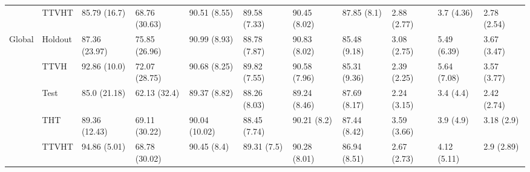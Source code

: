 \begin{table}
\begin{tabular}{lllllllllll}
       & TTVHT &   85.79 (16.7) &  68.76 (30.63) &   90.51 (8.55) &  89.58 (7.33) &  90.45 (8.02) &   87.85 (8.1) &      2.88 (2.77) &   3.7 (4.36) &  2.78 (2.54) \\
Global & Holdout &  87.36 (23.97) &  75.85 (26.96) &   90.99 (8.93) &  88.78 (7.87) &  90.83 (8.02) &  85.48 (9.18) &      3.08 (2.75) &  5.49 (6.39) &  3.67 (3.47) \\
       & TTVH &   92.86 (10.0) &  72.07 (28.75) &   90.68 (8.25) &  89.82 (7.55) &  90.58 (7.96) &  85.31 (9.36) &      2.39 (2.25) &  5.64 (7.08) &  3.57 (3.77) \\
       & Test &   85.0 (21.18) &   62.13 (32.4) &   89.37 (8.82) &  88.26 (8.03) &  89.24 (8.46) &  87.69 (8.17) &      2.24 (3.15) &    3.4 (4.4) &  2.42 (2.74) \\
       & THT &  89.36 (12.43) &  69.11 (30.22) &  90.04 (10.02) &  88.45 (7.74) &   90.21 (8.2) &  87.44 (8.42) &      3.59 (3.66) &    3.9 (4.9) &   3.18 (2.9) \\
       & TTVHT &   94.86 (5.01) &  68.78 (30.02) &    90.45 (8.4) &   89.31 (7.5) &  90.28 (8.01) &  86.94 (8.51) &      2.67 (2.73) &  4.12 (5.11) &   2.9 (2.89) \\
\bottomrule
\end{tabular}
\end{table}
